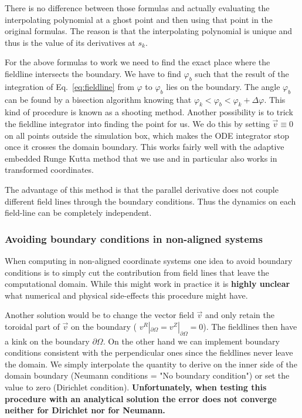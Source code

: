 There is no difference between those formulas and actually evaluating the
interpolating polynomial at a ghost point and then using that point in the
original formulas. The reason is that the interpolating polynomial is unique
and thus is the value of its derivatives at $s_k$.

For the above formulas to work we need to find the exact place where the fieldline intersects
the boundary.
We have to find
$\varphi_b$ such that the result of the integration of Eq.~\eqref{eq:fieldline} from
$\varphi$ to $\varphi_b$ lies on the boundary.
The angle $\varphi_b$ can be found by a bisection algorithm knowing that $\varphi_k<\varphi_b < \varphi_k + \Delta\varphi$.
This kind of procedure is known as a shooting method.
Another possibility is to trick the fieldline integrator into finding the point for us.
We do this by setting $\vec v \equiv 0$ on all points outside the simulation box, which
makes the ODE integrator stop once it crosses the domain boundary.
This works fairly well with the adaptive embedded Runge Kutta method that we use
and in particular also works in transformed coordinates.

The advantage of this method is that the parallel derivative
does not couple different field lines through the boundary conditions. Thus
the dynamics on each field-line can be completely independent.

\subsubsection{Avoiding boundary conditions in non-aligned systems} \label{sec:avoid}

When computing in non-aligned coordinate systems
one idea to avoid boundary conditions
is to simply cut the contribution from field lines
that leave the computational domain. While this might work in practice
it is \textbf{highly unclear} what numerical and physical side-effects this procedure might have.

Another solution would be to change the
vector field $\vec v$ and only retain the toroidal part of $\vec v$ on the
boundary ( $v^R|_{\partial\Omega} = v^Z|_{\partial\Omega} =0$). The fieldlines then have a kink on the boundary $\partial\Omega$.
On the other hand we can implement boundary conditions consistent with
the perpendicular ones since the fieldlines never leave the domain.
We simply interpolate the quantity to derive on the inner side of the
domain boundary (Neumann conditions = "No boundary condition") or
set the value to zero (Dirichlet condition).
\textbf{Unfortunately, when testing this procedure with an analytical solution
the error does not converge neither for Dirichlet nor for Neumann.}

